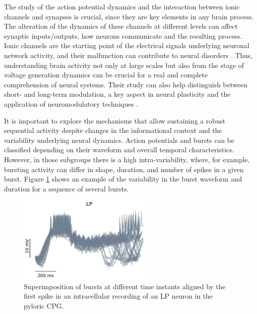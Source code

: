 The study of the action potential dynamics and the interaction between ionic channels and synapses is crucial, since they are key elements in any brain process. The alteration of the dynamics of these channels at different levels can affect synaptic inputs/outputs, how neurons communicate and the resulting process. Ionic channels are the starting point of the electrical signals underlying neuronal network activity, and their malfunction can contribute to neural disorders \parencite{kecskes_editorial_2023}. Thus, understanding brain activity not only at large scales but also from the stage of voltage generation dynamics can be crucial for a real and complete comprehension of neural systems. Their study can also help distinguish between short- and long-term modulation, a key aspect in neural plasticity and the application of neuromodulatory techniques \parencite{chambers_lightactivated_2008,burke_modulation_2019}.

 
It is important to explore the mechanisms that allow sustaining a robust sequential activity despite changes in the informational context and the variability underlying neural dynamics. Action potentials and bursts can be classified depending on their waveform and overall temporal characteristics. However, in those subgroups there is a high intra-variability, where, for example, bursting activity can differ in shape,  duration, and number of spikes in a given burst. Figure \ref{fig:burst variability} shows an example of the variability in the burst waveform and duration for a sequence of several bursts. 


\begin{figure}[htb!]
	\centering
	\includegraphics[width=0.6\textwidth]{img/intro/burst_variability.png}
	\caption{Superimposition of bursts at different time instants aligned by the first spike in an intracellular recording of an LP neuron in the pyloric CPG.}
	\label{fig:burst variability}
\end{figure}

